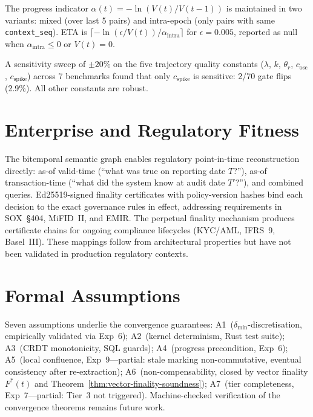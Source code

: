 \documentclass[11pt]{article}
\begin{document}
The progress indicator $\alpha(t) = -\ln(V(t) / V(t-1))$ is maintained in two variants: mixed (over last 5 pairs) and intra-epoch (only pairs with same \texttt{context\_seq}).
ETA is $\lceil -\ln(\epsilon / V(t)) / \alpha_{\text{intra}} \rceil$ for $\epsilon = 0.005$, reported as null when $\alpha_{\text{intra}} \leq 0$ or $V(t) = 0$.

A sensitivity sweep of $\pm 20\%$ on the five trajectory quality constants ($\lambda$, $k$, $\theta_r$, $c_{\text{osc}}$, $c_{\text{spike}}$) across 7 benchmarks found that only $c_{\text{spike}}$ is sensitive: 2/70 gate flips (2.9\%).
All other constants are robust.

\section{Enterprise and Regulatory Fitness}
\label{sec:enterprise}

The bitemporal semantic graph enables regulatory point-in-time reconstruction directly: as-of valid-time (``what was true on reporting date $T$?''), as-of transaction-time (``what did the system know at audit date $T'$?''), and combined queries.
Ed25519-signed finality certificates with policy-version hashes bind each decision to the exact governance rules in effect, addressing requirements in SOX~\S404, MiFID~II, and EMIR.
The perpetual finality mechanism produces certificate chains for ongoing compliance lifecycles (KYC/AML, IFRS~9, Basel~III).
These mappings follow from architectural properties but have not been validated in production regulatory contexts.

\section{Formal Assumptions}
\label{sec:app-assumptions}

Seven assumptions underlie the convergence guarantees:
A1~($\delta_{\min}$-discretisation, empirically validated via Exp~6);
A2~(kernel determinism, Rust test suite);
A3~(CRDT monotonicity, SQL guards);
A4~(progress precondition, Exp~6);
A5~(local confluence, Exp~9---partial: stale marking non-commutative, eventual consistency after re-extraction);
A6~(non-compensability, closed by vector finality $F^*(t)$ and Theorem~\ref{thm:vector-finality-soundness});
A7~(tier completeness, Exp~7---partial: Tier~3 not triggered).
Machine-checked verification of the convergence theorems remains future work.
\end{document}
